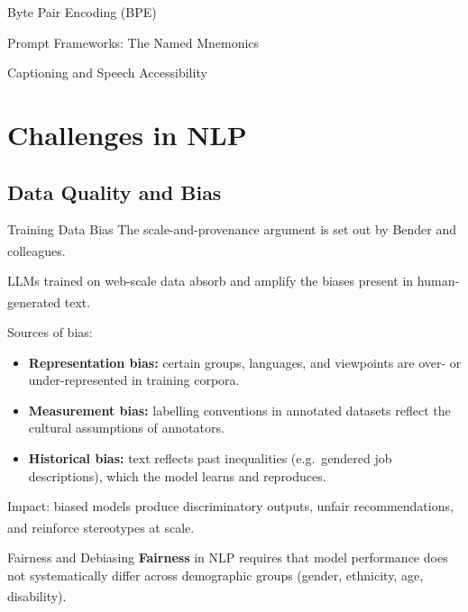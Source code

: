 \begin{v3topic}{Byte Pair Encoding (BPE)}
\begin{v3topic}{Prompt Frameworks: The Named Mnemonics}
\begin{v3topic}{Captioning and Speech Accessibility}
\end{v3topic}

\section{Challenges in NLP}

\subsection{Data Quality and Bias}


\begin{v3topic}{Training Data Bias}
    The scale-and-provenance argument is set out by Bender and
    colleagues\textsuperscript{\cite{benderDangersStochasticParrots2021}}.

    LLMs trained on web-scale data absorb and amplify the biases present in
    human-generated
    text.\textsuperscript{\cite[][p.~xii]{dhamaniIntroductionGenerativeAI2024}}

    Sources of bias:
    \begin{itemize}
        \item \textbf{Representation bias:} certain groups, languages, and viewpoints
              are over- or under-represented in training corpora.
        \item \textbf{Measurement bias:} labelling conventions in annotated datasets
              reflect the cultural assumptions of annotators.
        \item \textbf{Historical bias:} text reflects past inequalities (e.g.\ gendered
              job descriptions), which the model learns and reproduces.
    \end{itemize}

    Impact: biased models produce discriminatory outputs, unfair recommendations, and
    reinforce stereotypes at
    scale.\textsuperscript{\cite[][p.~xii]{dhamaniIntroductionGenerativeAI2024}}

\end{v3topic}
\begin{v3topic}{Fairness and Debiasing}
    \textbf{Fairness} in NLP requires that model performance does not systematically
    differ across demographic groups (gender, ethnicity, age,
    disability).\textsuperscript{\cite[][p.~140]{farrisHowLargeLanguage2025}}


\end{v3topic}
\end{v3topic}
\end{v3topic}
